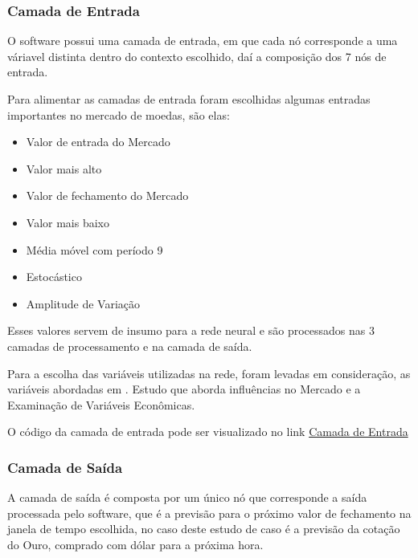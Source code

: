 \pagebreak

\subsubsection[Camada de Entrada]{Camada de Entrada}

O software possui uma camada de entrada, em que cada nó corresponde a uma váriavel distinta dentro do contexto escolhido, daí
a composição dos 7 nós de entrada.

Para alimentar as camadas de entrada foram escolhidas algumas entradas importantes no mercado de moedas, são elas:

\begin{itemize}
  \item Valor de entrada do Mercado
  \item Valor mais alto
  \item Valor de fechamento do Mercado
  \item Valor mais baixo
  \item Média móvel com período 9
  \item Estocástico
  \item Amplitude de Variação
\end{itemize}

Esses valores servem de insumo para a rede neural e são processados nas 3 camadas de processamento e na camada de saída.

Para a escolha das variáveis utilizadas na rede, foram levadas em consideração, as variáveis abordadas em \cite{tau}.
Estudo que aborda influências no Mercado e a Examinação de Variáveis Econômicas.

O código da camada de entrada pode ser visualizado no link  \href{https://github.com/matmello/brainbot/tree/master/input}{Camada de Entrada}


\subsubsection[Camada de Saída]{Camada de Saída}

A camada de saída é composta por um único nó que corresponde a saída processada pelo software, que é a previsão para o próximo valor
de fechamento na janela de tempo escolhida, no caso deste estudo de caso é a previsão da cotação do Ouro, comprado com dólar para a
próxima hora.

